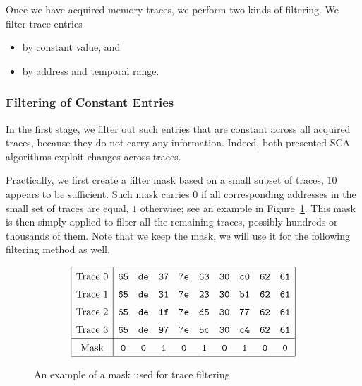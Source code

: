 Once we have acquired memory traces, we perform two kinds of filtering. We filter trace entries
\begin{itemize}
	\item by constant value, and
	\item by address and temporal range.
\end{itemize}

\subsubsection{Filtering of Constant Entries}
	
	In the first stage, we filter out such entries that are constant across all acquired traces, because they do not carry any information. Indeed, both presented SCA algorithms exploit changes across traces.
	
	Practically, we first create a filter mask based on a small subset of traces, $10$ appears to be sufficient. Such mask carries $0$ if all corresponding addresses in the small set of traces are equal, $1$ otherwise; see an example in Figure~\ref{fig:constmask}. This mask is then simply applied to filter all the remaining traces, possibly hundreds or thousands of them. Note that we keep the mask, we will use it for the following filtering method as well.
	
	\begin{figure}[H]
	\[
	\arraycolsep=.5em\def\arraystretch{1.5}
		\begin{array}{|c|ccccccccc|}
			\hline
			\textnormal{Trace 0} & {\tt 65} & {\tt de} & {\tt 37} & {\tt 7e} & {\tt 63} & {\tt 30} & {\tt c0} & {\tt 62} & {\tt 61} \\
			\textnormal{Trace 1} & {\tt 65} & {\tt de} & {\tt 31} & {\tt 7e} & {\tt 23} & {\tt 30} & {\tt b1} & {\tt 62} & {\tt 61} \\
			\textnormal{Trace 2} & {\tt 65} & {\tt de} & {\tt 1f} & {\tt 7e} & {\tt d5} & {\tt 30} & {\tt 77} & {\tt 62} & {\tt 61} \\
			\textnormal{Trace 3} & {\tt 65} & {\tt de} & {\tt 97} & {\tt 7e} & {\tt 5c} & {\tt 30} & {\tt c4} & {\tt 62} & {\tt 61} \\
			\hline
			\textnormal{Mask}    & {\tt 0}  & {\tt 0}  & {\tt 1}  & {\tt 0}  & {\tt 1}  & {\tt 0}  & {\tt 1}  & {\tt 0}  & {\tt 0} \\
			\hline
		\end{array}
	\]
	\caption{An example of a mask used for trace filtering.}
	\label{fig:constmask}
	\end{figure}
	
